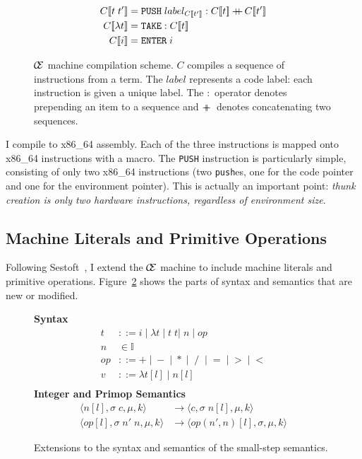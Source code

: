 \begin{figure}
\begin{align*} C[\![t \; t']\!] &= \texttt{PUSH}\;label_{C[\![t']\!]}:C[\![t]\!] \concat C[\![t']\!] \\
C[\![\lambda t]\!] &= \texttt{TAKE}:C[\![t]\!] \\
C[\![i]\!] &= \texttt{ENTER} \; i
\end{align*}
\caption{$\mathcal{\mathcal{C} \mskip -4mu \mathcal{E}}$ machine compilation scheme. $C$ compiles a sequence of
instructions from a term. The $label$ represents a code label: each instruction
is given a unique label. The $:$ operator denotes prepending an item to a
sequence and $+\!\!\!\!+\,$ denotes concatenating two sequences.}
\label{fig:cemcompile}
\end{figure}

I compile to x86\_64 assembly. Each of the three instructions is mapped onto
x86\_64 instructions with a macro. The \texttt{PUSH} instruction is particularly
simple, consisting of only two x86\_64 instructions (two \texttt{push}es, one for
the code pointer and one for the environment pointer). This is actually an
important point: \emph{thunk creation is only two hardware instructions,
regardless of environment size}.  

\subsection{Machine Literals and Primitive Operations}

Following Sestoft~\cite{sestoft}, I extend the $\mathcal{\mathcal{C} \mskip -4mu \mathcal{E}}$ machine to
include machine literals and primitive operations. Figure~\ref{fig:extsyntax}
shows the parts of syntax and semantics that are new or modified. 

\begin{figure}
\textbf{Syntax}
\begin{align*}
\tag{Term}    t &::= i \; | \; \lambda t \; | \; t \; t | \; n \; | \; op \\
\tag{Integer} n &\in \mathbb{I} \\
\tag{PrimOp} op &::= + \; | \; - \; | \; * \; | \; \; / \;\; | \; = \; | \; > \; | \; < \\
\tag{Value} v &::= \lambda t[l] \; | \; n[l] \\
\end{align*}
\textbf{Integer and Primop Semantics}
\begin{align*}
\tag{Int}
\langle n[l], \sigma \; c, \mu, k \rangle
  &\rightarrow
\langle c, \sigma \; n[l], \mu, k \rangle \\
\tag{Op} 
\langle op[l], \sigma \; n' \; n, \mu, k \rangle
  &\rightarrow
\langle op(n',n)[l], \sigma, \mu, k \rangle
\end{align*}
\caption{Extensions to the syntax and semantics of the small-step \ce semantics.}
\label{fig:extsyntax}
\end{figure}

